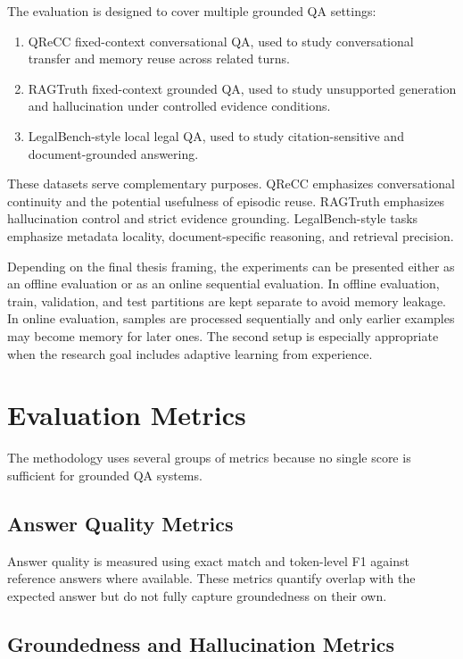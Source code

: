The evaluation is designed to cover multiple grounded QA settings:

\begin{enumerate}[leftmargin=*]
\item QReCC fixed-context conversational QA, used to study conversational transfer and memory reuse across related turns.
\item RAGTruth fixed-context grounded QA, used to study unsupported generation and hallucination under controlled evidence conditions.
\item LegalBench-style local legal QA, used to study citation-sensitive and document-grounded answering.
\end{enumerate}

These datasets serve complementary purposes. QReCC emphasizes conversational continuity and the potential usefulness of episodic reuse. RAGTruth emphasizes hallucination control and strict evidence grounding. LegalBench-style tasks emphasize metadata locality, document-specific reasoning, and retrieval precision.

Depending on the final thesis framing, the experiments can be presented either as an offline evaluation or as an online sequential evaluation. In offline evaluation, train, validation, and test partitions are kept separate to avoid memory leakage. In online evaluation, samples are processed sequentially and only earlier examples may become memory for later ones. The second setup is especially appropriate when the research goal includes adaptive learning from experience.

\section{Evaluation Metrics}
\label{sec:methodology-metrics}

The methodology uses several groups of metrics because no single score is sufficient for grounded QA systems.

\subsection{Answer Quality Metrics}
\label{subsec:methodology-answer-quality}

Answer quality is measured using exact match and token-level F1 against reference answers where available. These metrics quantify overlap with the expected answer but do not fully capture groundedness on their own.

\subsection{Groundedness and Hallucination Metrics}
\label{subsec:methodology-groundedness}

